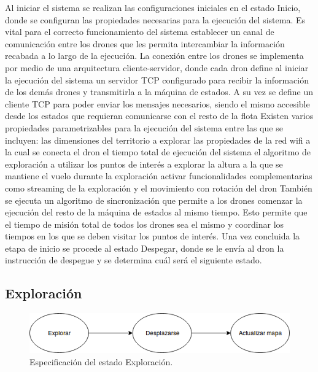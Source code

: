 Al iniciar el sistema se realizan las configuraciones iniciales en el estado Inicio, donde se configuran las propiedades necesarias para la ejecución del sistema.
Es vital para el correcto funcionamiento del sistema establecer un canal de comunicación entre los drones que les permita intercambiar la información recabada a lo largo de la ejecución. La conexión entre los drones se implementa por medio de una arquitectura cliente-servidor, donde cada dron define al iniciar la ejecución del sistema un servidor TCP configurado para recibir la información de los demás drones y transmitirla a la máquina de estados. A su vez se define un cliente TCP para poder enviar los mensajes necesarios, siendo el mismo accesible desde los estados que requieran comunicarse con el resto de la flota
Existen varios propiedades parametrizables para la ejecución del sistema entre las que se incluyen:
las dimensiones del territorio a explorar 
las propiedades de la red wifi a la cual se conecta el dron
el tiempo total de ejecución del sistema
el algoritmo de exploración a utilizar
los puntos de interés a explorar
la altura a la que se mantiene el vuelo durante la exploración
activar funcionalidades complementarias como streaming de la exploración y el movimiento con rotación del dron
También se ejecuta un algoritmo de sincronización que permite a los drones comenzar la ejecución del resto de la máquina de estados al mismo tiempo. Esto permite que el tiempo de misión total de todos los drones sea el mismo y coordinar los tiempos en los que se deben visitar los puntos de interés.
Una vez concluida la etapa de inicio se procede al estado Despegar, donde se le envía al dron la instrucción de despegue y se determina cuál será el siguiente estado. 
\subsection {Exploración}

\begin{figure}[h!]
	\label{fig:comp}
	\includegraphics[width=.8\textwidth]{imagenes/chap5/image3}
	\caption{Especificación del estado Exploración.}
\end{figure}


